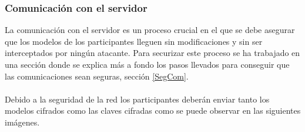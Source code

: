 \subsubsection{Comunicación con el servidor}
La comunicación con el servidor es un proceso crucial en el que se debe asegurar que los modelos de los participantes lleguen sin modificaciones y sin ser interceptados por ningún atacante. Para securizar este proceso se ha trabajado en una sección donde se explica más a fondo los pasos llevados para conseguir que las comunicaciones sean seguras, sección \ref{SegCom}.
\\ \\
Debido a la seguridad de la red los participantes deberán enviar tanto los modelos cifrados como las claves cifradas como se puede observar en las siguientes imágenes.

